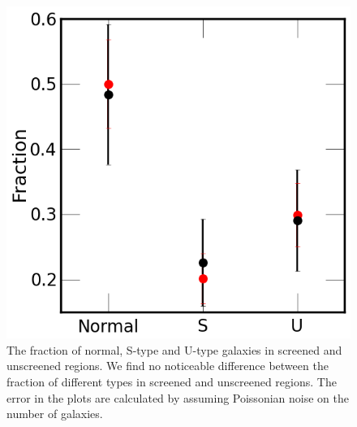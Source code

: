 \documentclass[useAMS,usenatbib,twocolumn]{mn2e}
\begin{document}
\begin{figure}
\begin{center}
  \includegraphics[scale=0.4]{figures/Frac-S-U-N.png}
 \caption{The fraction of normal, S-type and U-type galaxies in screened and
unscreened regions. We find no noticeable difference between the fraction of
different types in screened and unscreened regions. The error in the plots are
calculated by assuming Poissonian noise on the number of galaxies.}
\label{warp-frac}
\end{center}
\end{figure}
\end{document}
